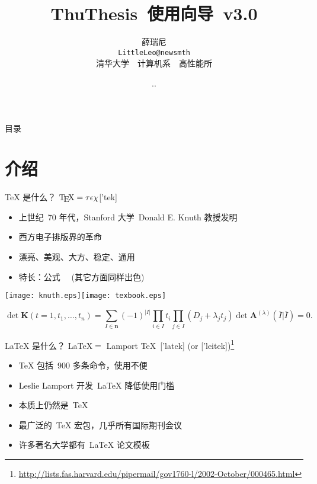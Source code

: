 \documentclass[dvipsnames, svgnames, mode=present, paper=screen, size=9pt,
style=husky]{powerdot}
\newcommand{\fs}{\CJKfamily{fs}}        %
\newcommand{\hei}{\CJKfamily{hei}}      %
\newcommand{\li}{\CJKfamily{li}}        %
\newcommand{\envert}[1]{\left\lvert#1\right\rvert}
\begin{document}
\begin{CJK*}{GBK}{song}
\def\version{v3.0}
\title{\hei\Huge ThuThesis~使用向导~\version}
\author{\fs 薛瑞尼\\[5pt]\texttt{LittleLeo@newsmth}\\[10pt]\li 清华大学~~计算机系~~高性能所}
\date{\the\year.\the\month.\the\day}
\maketitle


\begin{slide}[toc=, bm=]{目录}
\tableofcontents[type=1, content=sections]
\end{slide}


\section{介绍}
\begin{slide}[]{\TeX{} 是什么？}
$\mbox{\TeX} = \tau\epsilon\chi$['tek]
  \begin{itemize}
  \item 上世纪~70 年代，Stanford 大学~Donald E. Knuth 教授发明
  \item 西方电子排版界的革命
  \item 漂亮、美观、大方、稳定、通用
  \item 特长：公式~~ (其它方面同样出色)
  \end{itemize}
\medskip

\centering
\texttt{[image: knuth.eps]}\hspace{2cm}\texttt{[image: texbook.eps]}

\begin{equation}
\det\mathbf{K}(t=1,t_1,\dots,t_n)=\sum_{I\in\mathbf{n}}(-1)^{\envert{I}}
\prod_{i\in I}t_i\prod_{j\in I}(D_j+\lambda_jt_j)\det\mathbf{A}
^{(\lambda)}(\overline{I}|\overline{I})=0.
\end{equation} 
\end{slide}

\begin{slide}{\LaTeX{} 是什么？}
\LaTeX $=$ Lamport \TeX~['latek] (or ['leitek])\footnote{\url{http://lists.fas.harvard.edu/pipermail/gov1760-l/2002-October/000465.html}}
  \begin{itemize}
  \item \TeX{} 包括~900 多条命令，使用不便
  \item Leslie Lamport 开发~\LaTeX{} 降低使用门槛
  \item 本质上仍然是~\TeX{}
  \item 最广泛的~\TeX{} 宏包，几乎所有国际期刊会议
  \item 许多著名大学都有~\LaTeX{} 论文模板
  \end{itemize}
\bigskip


\end{slide}
\end{CJK*}
\end{document}
